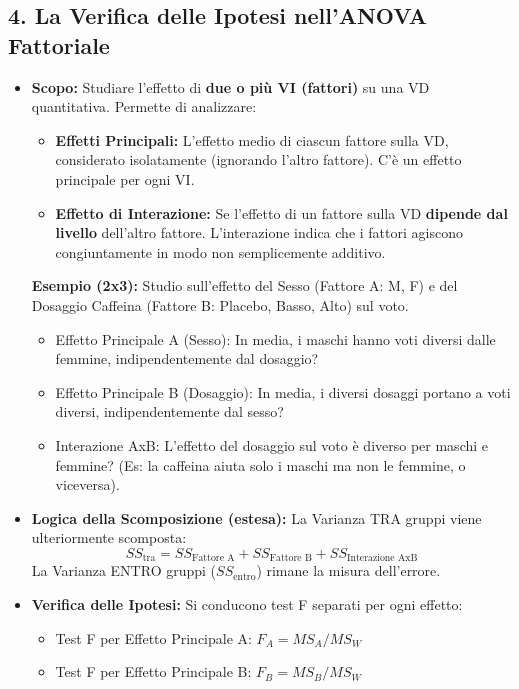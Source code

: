 \documentclass[12pt, a4paper]{article}
\newcommand{\SSb}{SS_{\text{tra}}} %
\newcommand{\SSw}{SS_{\text{entro}}} %
\begin{document}
\subsection*{4. La Verifica delle Ipotesi nell'ANOVA Fattoriale}
\begin{itemize}
    \item \textbf{Scopo:} Studiare l'effetto di \textbf{due o più VI (fattori)} su una VD quantitativa. Permette di analizzare:
        \begin{itemize}
            \item \textbf{Effetti Principali:} L'effetto medio di ciascun fattore sulla VD, considerato isolatamente (ignorando l'altro fattore). C'è un effetto principale per ogni VI.
            \item \textbf{Effetto di Interazione:} Se l'effetto di un fattore sulla VD \textbf{dipende dal livello} dell'altro fattore. L'interazione indica che i fattori agiscono congiuntamente in modo non semplicemente additivo.
        \end{itemize}
    \textbf{Esempio (2x3):} Studio sull'effetto del Sesso (Fattore A: M, F) e del Dosaggio Caffeina (Fattore B: Placebo, Basso, Alto) sul voto. %
    \begin{itemize}
        \item Effetto Principale A (Sesso): In media, i maschi hanno voti diversi dalle femmine, indipendentemente dal dosaggio?
        \item Effetto Principale B (Dosaggio): In media, i diversi dosaggi portano a voti diversi, indipendentemente dal sesso?
        \item Interazione AxB: L'effetto del dosaggio sul voto è diverso per maschi e femmine? (Es: la caffeina aiuta solo i maschi ma non le femmine, o viceversa).
    \end{itemize}
    \item \textbf{Logica della Scomposizione (estesa):} La Varianza TRA gruppi viene ulteriormente scomposta:
        $$ \SSb = SS_{\text{Fattore A}} + SS_{\text{Fattore B}} + SS_{\text{Interazione AxB}} $$
        La Varianza ENTRO gruppi ($\SSw$) rimane la misura dell'errore.
    \item \textbf{Verifica delle Ipotesi:} Si conducono test F separati per ogni effetto:
        \begin{itemize}
            \item Test F per Effetto Principale A: $F_A = MS_A / MS_W$
            \item Test F per Effetto Principale B: $F_B = MS_B / MS_W$

\end{itemize}
\end{itemize}
\end{document}
